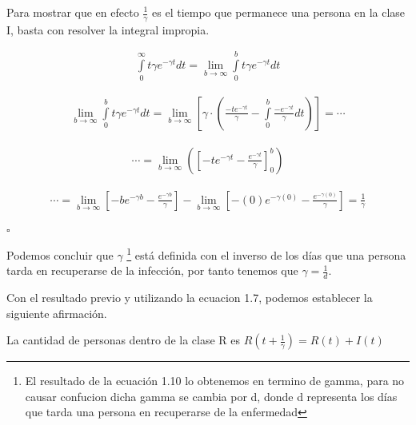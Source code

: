 \begin{Dem}

Para mostrar que en efecto $\frac{1}{\gamma}$ es el tiempo que permanece una persona en la clase I, basta con resolver la integral impropia.

\begin{align*} 
\int \limits_{0}^{\infty} t\gamma e^{-\gamma t} dt = \lim\limits_{b\rightarrow \infty} \int \limits_{0}^{b} t\gamma e^{-\gamma t}dt 
\end{align*}

\begin{align*}
\lim\limits_{b\rightarrow \infty} \int \limits_{0}^{b} t\gamma e^{-\gamma t}dt = \lim\limits_{b\rightarrow \infty} \left[ \gamma \cdot \left( \frac{-t e^{-\gamma t}}{\gamma} - \int \limits_{0}^{b} \frac{-e^{-\gamma t}}{\gamma} dt \right)\right] = \cdots
\end{align*}

\begin{align*}
\cdots = \lim\limits_{b\rightarrow \infty} \left( \left[ -te^{- \gamma t} - \frac{e^{-\gamma t}}{\gamma} \right]_0^b \right) 
\end{align*}

\begin{align*}
\cdots = \lim\limits_{b\rightarrow \infty} \left[ -be^{- \gamma b} - \frac{e^{- \gamma b}}{\gamma} \right] - \lim\limits_{b\rightarrow \infty} \left[ -(0)e^{- \gamma (0)} - \frac{e^{- \gamma (0)}}{\gamma} \right] = \frac{1}{\gamma}  \\
\end{align*}

\hfill	$\square$

\end{Dem}

Podemos concluir que $\gamma$ \footnote{El resultado de la ecuación 1.10 lo obtenemos en termino de gamma, para no causar confucion dicha gamma se cambia por d, donde d representa los días que tarda una persona en recuperarse de la enfermedad} está definida con el inverso de los días que una persona tarda en recuperarse de la infección, por tanto tenemos que $\gamma = \frac{1}{d}$.

Con el resultado previo y utilizando la ecuacion 1.7, podemos establecer la siguiente afirmación.

\begin{Af}
La cantidad de personas dentro de la clase R es $R(t+\frac{1}{\gamma}) = R(t) + I(t)$
\end{Af}


